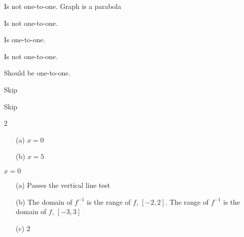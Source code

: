 \documentclass{article}
\begin{document}
\begin{Answer}
    Is not one-to-one. Graph is a parabola
\end{Answer}

\begin{Answer}
    Is not one-to-one.
\end{Answer}

\begin{Answer}
    Is one-to-one.
\end{Answer}

\begin{Answer}
    Is not one-to-one.
\end{Answer}

\begin{Answer}
    Should be one-to-one.
\end{Answer}

\begin{Answer} Skip \end{Answer}
\begin{Answer} Skip \end{Answer}

\begin{Answer} 
    2 
\end{Answer}

\begin{Answer} 
    \begin{itemize}
        \item[(a)]
            $x = 0$
        \item[(b)]
            $x = 5$
    \end{itemize}
\end{Answer}

\begin{Answer}
    $x = 0$
\end{Answer}

\begin{Answer}
    \begin{itemize}
        \item[(a)]
            Passes the vertical line test
        \item[(b)]
            The domain of $f^{-1}$ is the range of $f$, $[-2, 2]$. The range of $f^{-1}$ is the domain of $f$, $[-3, 3]$
        \item[(c)]
            $2$
    \end{itemize}
\end{Answer}
\end{document}
